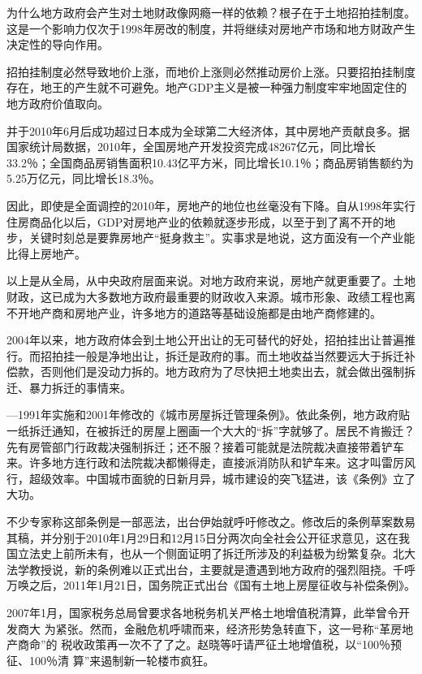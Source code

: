 为什么地方政府会产生对土地财政像网瘾一样的依赖？根子在于土地招拍挂制度。这是一个影响力仅次于1998年房改的制度，并将继续对房地产市场和地方财政产生决定性的导向作用。

招拍挂制度必然导致地价上涨，而地价上涨则必然推动房价上涨。只要招拍挂制度存在，地王的产生就不可避免。地产GDP主义是被一种强力制度牢牢地固定住的地方政府价值取向。

并于2010年6月后成功超过日本成为全球第二大经济体，其中房地产贡献良多。据国家统计局数据，2010年，全国房地产开发投资完成48267亿元，同比增长33.2％；全国商品房销售面积10.43亿平方米，同比增长10.1％；商品房销售额约为5.25万亿元，同比增长18.3％。

因此，即使是全面调控的2010年，房地产的地位也丝毫没有下降。自从1998年实行住房商品化以后，GDP对房地产业的依赖就逐步形成，以至于到了离不开的地步，关键时刻总是要靠房地产“挺身救主”。实事求是地说，这方面没有一个产业能比得上房地产。

以上是从全局，从中央政府层面来说。对地方政府来说，房地产就更重要了。土地财政，这已成为大多数地方政府最重要的财政收入来源。城市形象、政绩工程也离不开地产商和房地产业，许多地方的道路等基础设施都是由地产商修建的。

2004年以来，地方政府体会到土地公开出让的无可替代的好处，招拍挂出让普遍推行。而招拍挂一般是净地出让，拆迁是政府的事。而土地收益当然要远大于拆迁补偿款，否则他们是没动力拆的。地方政府为了尽快把土地卖出去，就会做出强制拆迁、暴力拆迁的事情来。


—1991年实施和2001年修改的《城市房屋拆迁管理条例》。依此条例，地方政府贴一纸拆迁通知，在被拆迁的房屋上圈画一个大大的“拆”字就够了。居民不肯搬迁？先有房管部门行政裁决强制拆迁；还不服？接着可能就是法院裁决直接带着铲车来。许多地方连行政和法院裁决都懒得走，直接派消防队和铲车来。这才叫雷厉风行，超级效率。中国城市面貌的日新月异，城市建设的突飞猛进，该《条例》立了大功。

不少专家称这部条例是一部恶法，出台伊始就呼吁修改之。修改后的条例草案数易其稿，并分别于2010年1月29日和12月15日分两次向全社会公开征求意见，这在我国立法史上前所未有，也从一个侧面证明了拆迁所涉及的利益极为纷繁复杂。北大法学教授说，新的条例难以正式出台，主要就是遭遇到地方政府的强烈阻挠。千呼万唤之后，2011年1月21日，国务院正式出台《国有土地上房屋征收与补偿条例》。



2007年1月，国家税务总局曾要求各地税务机关严格土地增值税清算，此举曾令开发商大
为紧张。然而，金融危机呼啸而来，经济形势急转直下，这一号称“革房地产商命”的
税收政策再一次不了了之。赵晓等吁请严征土地增值税，以“100％预征、100％清
算”来遏制新一轮楼市疯狂。

